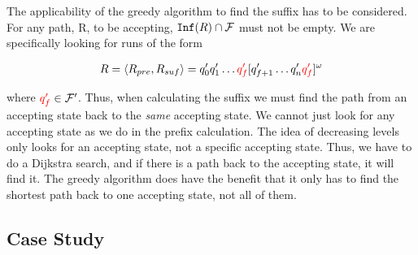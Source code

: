 The applicability of the greedy algorithm to find the suffix has to be considered. For any path, R, to be accepting, $\texttt{Inf}(R) \cap \mathcal{F}$ must not be empty. We are specifically looking for runs of the form 

\begin{align*}
R &= \langle R_{pre}, R_{suf} \rangle = q_0' q_1' \dots {\color{red} q_f'} [q_{f+1}' \dots q_n' {\color{red} q_f'}]^\omega \\
\end{align*}

where ${\color{red} q_f'} \in \mathcal{F}'$. Thus, when calculating the suffix we must find the path from an accepting state back to the \textit{same} accepting state. We cannot just look for any accepting state as we do in the prefix calculation. The idea of decreasing levels only looks for an accepting state, not a specific accepting state. Thus, we have to do a Dijkstra search, and if there is a path back to the accepting state, it will find it. The greedy algorithm does have the benefit that it only has to find the shortest path back to one accepting state, not all of them.





\subsection{Case Study}





